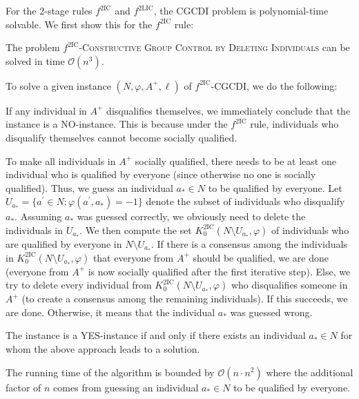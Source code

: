 \documentclass[
    12pt,               %
    a4paper,            %
    bibtotoc,           %
    pointlessnumbers,   %
    ngerman,            %
    titlepage,          %
    leqno,              %
    ]{scrarticle}       %
\begin{document}
For the 2-stage rules $f^{\text{2IC}}$ and $f^{\text{2LIC}}$, the CGCDI problem is polynomial-time solvable. We first show this for the $f^{\text{2IC}}$ rule:

\begin{Theorem} \label{thm:2ic_cgcdi_p}
The problem $f^{\text{2IC}}$-\textsc{Constructive Group Control by Deleting Individuals} can be solved in time $\mathcal{O}(n^3)$.
\end{Theorem}

\begin{Proof}
To solve a given instance $(N, \varphi, A^+, \ell)$ of $f^{\text{2IC}}$-CGCDI, we do the following:

If any individual in $A^+$ disqualifies themselves, we immediately conclude that the instance is a NO-instance. This is because under the $f^{\text{2IC}}$ rule, individuals who disqualify themselves cannot become socially qualified.

To make all individuals in $A^+$ socially qualified, there needs to be at least one individual who is qualified by everyone (since otherwise no one is socially qualified). Thus, we guess an individual $a_\ast \in N$ to be qualified by everyone. Let $U_{a_\ast} = \{ a^\prime \in N : \varphi(a^\prime, a_\ast) = -1 \}$ denote the subset of individuals who disqualify $a_\ast$. Assuming $a_\ast$ was guessed correctly, we obviously need to delete the individuals in $U_{a_\ast}$. We then compute the set $K^{\text{2IC}}_0(N \setminus U_{a_\ast}, \varphi)$ of individuals who are qualified by everyone in $N \setminus U_{a_\ast}$. If there is a consensus among the individuals in $K^{\text{2IC}}_0(N \setminus U_{a_\ast}, \varphi)$ that everyone from $A^+$ should be qualified, we are done (everyone from $A^+$ is now socially qualified after the first iterative step). Else, we try to delete every individual from $K^{\text{2IC}}_0(N \setminus U_{a_\ast}, \varphi)$ who disqualifies someone in $A^+$ (to create a consensus among the remaining individuals). If this succeeds, we are done. Otherwise, it means that the individual $a_\ast$ was guessed wrong.

The instance is a YES-instance if and only if there exists an individual $a_\ast \in N$ for whom the above approach leads to a solution.

The running time of the algorithm is bounded by $\mathcal{O}(n \cdot n^2)$ where the additional factor of $n$ comes from guessing an individual $a_\ast \in N$ to be qualified by everyone.
\end{Proof}
\end{document}
